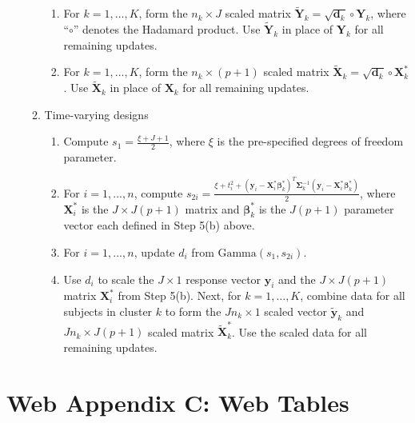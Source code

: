 \documentclass[useAMS,11pt]{article}
\newcommand{\1}{\mathbbm{1}}
\begin{document}
\begin{enumerate}
\begin{enumerate}
\begin{enumerate}
		\item For $k=1,\ldots,K$, form the $n_k\times J$ scaled matrix $\tilde{\mathbf{Y}}_{k}=\sqrt{\mathbf{d}_k}\circ\mathbf{Y}_{k}$, where ``$\circ$'' denotes the Hadamard product. Use $\tilde{\mathbf{Y}}_{k}$ in place of
              $\mathbf{Y}_k$ for
              all remaining updates.\vspace{2pt}
		\item For $k=1,\ldots,K$, form the $n_k \times (p+1)$ scaled matrix $\tilde{\mathbf{X}}_k=\sqrt{\mathbf{d}_k}\circ\mathbf{X}^*_k$. Use $\tilde{\mathbf{X}}_{k}$ in place of $\mathbf{X}_k$ for all remaining
              updates.\vspace{2pt}
        \end{enumerate}

        \item Time-varying designs
         \begin{enumerate}
		\item Compute $s_1 = \frac{\xi + J + 1}{2}$, where $\xi$ is the pre-specified degrees of freedom parameter.\vspace{2pt}
		\item For $i = 1,...,n$, compute $s_{2i} = \frac{\xi + t_i^2 + (\mathbf{y}_i - \mathbf{X}^*_i\boldsymbol\beta^*_k)^T\boldsymbol\Sigma_k^{-1}(\mathbf{y}_i -  \mathbf{X}^*_i\boldsymbol\beta^*_k)}{2}$, where
              $\mathbf{X}^*_i$ is the $J\times J(p+1)$  matrix and $\boldsymbol\beta^*_k$ is the $J(p+1)$ parameter vector each defined in Step 5(b) above.\vspace{2pt}
		\item For $i = 1,...,n$, update $d_{i}$ from $\text{Gamma}(s_1,s_{2i})$.\vspace{2pt}
        \item Use $d_i$ to scale the $J\times 1$ response vector $\mathbf{y}_i$ and the $J \times J(p+1)$ matrix $\mathbf{X}^*_i$ from Step 5(b). Next, for $k=1,\ldots,K$, combine data for all subjects in cluster $k$ to form
              the $Jn_k\times 1$ scaled vector $\tilde{\mathbf{y}}_k$ and $Jn_k\times J(p+1)$ scaled matrix $\tilde{\mathbf{X}}^*_k$. Use the scaled data for all remaining updates.
        \end{enumerate}
	\end{enumerate}
\end{enumerate}
\clearpage
\section*{Web Appendix C: Web Tables}
\end{document}
